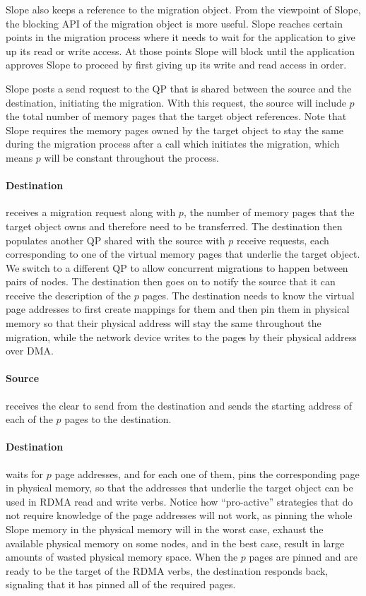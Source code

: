 Slope also keeps a reference to the migration object. From the viewpoint of
Slope, the blocking API of the migration object is more
useful. Slope reaches certain points in the migration process where it needs to wait
for the application to give up its read or write access. At those points Slope
will block until the application approves Slope to proceed by first giving up
its write and read access in order.

Slope posts a send request to the QP that is shared
between the source and the destination, initiating the migration.
With this request, the source will include $p$ the total number of
memory pages that the target object references. Note that Slope requires the
memory pages owned by the target object to stay the same during the migration
process after a call which initiates the migration, which means $p$ will be
constant throughout the process.

\paragraph{Destination}
receives a migration request along with $p$, the number of memory pages that the
target object owns and therefore need to
be transferred. The destination then populates another QP shared with the source
with $p$ receive requests, each corresponding to one of the virtual memory pages
that underlie the target object. We switch to a different QP
to allow concurrent migrations to happen between pairs of nodes. The destination
then goes on to notify the source that it can receive the description of the $p$
pages. The destination needs to know the virtual page addresses
to first create mappings for them and then pin them in physical memory so that their
physical address will stay the same throughout the migration, while the network
device writes to the pages by their physical address over DMA.

\paragraph{Source} receives the clear to send from the destination and sends the starting address
of each of the $p$ pages to the destination. 

\paragraph{Destination} waits for $p$ page addresses, and for each one of them, pins the
corresponding page in physical memory, so that the addresses that underlie the
target object can be used in RDMA read and write verbs. Notice how
``pro-active'' strategies that do not require knowledge of the page addresses
will not work, as pinning the
whole Slope memory in the physical memory will in the worst case, exhaust the
available physical memory on some nodes, and in the best case, result in large
amounts of wasted physical memory space. When the $p$ pages are pinned
and are ready to be the target of the RDMA verbs, the destination responds back,
signaling that it has pinned all of the required pages.

